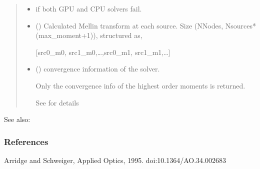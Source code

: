 \documentclass[letterpaper,10pt,english]{sphinxmanual}
\begin{document}
\begin{fulllineitems}
\begin{quote}
\begin{description}
\begin{itemize}
\item {} 
\sphinxAtStartPar
{} \textendash{} if both GPU and CPU solvers fail.

\end{itemize}

\sphinxAtStartPar
\begin{itemize}
\item {} 
\sphinxAtStartPar
{} () \textendash{} Calculated Mellin transform at each source. Size (NNodes, Nsources*(max\_moment+1)), structured as,

\sphinxAtStartPar
{[}src0\_m0, src1\_m0,…,src0\_m1, src1\_m1,…{]}

\item {} 
\sphinxAtStartPar
{} () \textendash{} convergence information of the solver.

\sphinxAtStartPar
Only the convergence info of the highest order moments is returned.

\sphinxAtStartPar
See {\hyperref[\detokenize{_autosummary/nirfasterff.utils.ConvergenceInfo:nirfasterff.utils.ConvergenceInfo}]{}} for details

\end{itemize}


\end{description}\end{quote}


\begin{sphinxseealso}{See also:}

\sphinxAtStartPar
{\hyperref[\detokenize{_autosummary/nirfasterff.math.gen_mass_matrix:nirfasterff.math.gen_mass_matrix}]{}}


\end{sphinxseealso}

\subsubsection*{References}

\sphinxAtStartPar
Arridge and Schweiger, Applied Optics, 1995. doi:10.1364/AO.34.002683

\end{fulllineitems}


\sphinxstepscope
\end{document}
